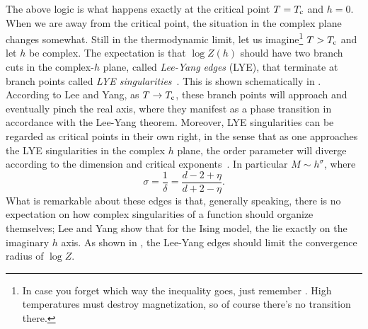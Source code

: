 The above logic is what happens exactly at the critical point $T=T_{\rm c}$ and $h=0$.
When we are away from the critical point, the situation in the complex plane
changes somewhat. Still in the thermodynamic limit, let us 
imagine\footnote{In case you forget which way the inequality goes, just
remember . High temperatures must destroy
magnetization, so of course there's no transition there.} $T>T_{\rm c}$ 
and let $h$ be complex. The expectation is that $\log Z(h)$ should
have two branch cuts in the complex-$h$ plane, called 
{\it Lee-Yang edges} (LYE), that terminate at
branch points called {\it LYE singularities}~\cite{lee_statistical_1952}.
This is shown schematically in . According to Lee and Yang, 
as $T\to T_{\rm c}$, these branch points will approach and eventually
pinch the real axis, where they manifest as a phase transition
in accordance with the Lee-Yang theorem.
Moreover, LYE singularities can be regarded as critical points in their
own right, in the sense that as one approaches the LYE singularities 
in the complex $h$ plane, the order parameter will diverge
according to the dimension and critical 
exponents~\cite{fisher_yang-lee_1978}. In particular $M\sim h^\sigma$, where
\begin{equation}
\sigma=\frac{1}{\delta}=\frac{d-2+\eta}{d+2-\eta}.
\end{equation}
What is remarkable about these edges is that, generally speaking,
there is no expectation on how complex singularities of a function
should organize themselves; Lee and Yang show that for the Ising model,
the lie exactly on the imaginary $h$ axis.
As shown in , the Lee-Yang edges should limit the convergence
radius of $\log Z$. 


